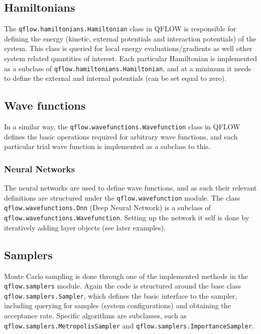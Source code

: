 \documentclass[Thesis.tex]{subfiles}
\begin{document}
\subsection{Hamiltonians}

The \texttt{qflow.\-hamiltonians.\-Hamiltonian} class in QFLOW is responsible for defining the energy
(kinetic, external potentials and interaction potentials) of the system. This
class is queried for local energy evaluations/gradients as well other system
related quantities of interest. Each particular Hamiltonian is implemented as a
subclass of \texttt{qflow.\-hamiltonians.\-Hamiltonian}, and at a minimum it needs to define the
external and internal potentials (can be set equal to zero).

\subsection{Wave functions}

In a similar way, the \texttt{qflow.\-wavefunctions.\-Wavefunction} class in QFLOW defines the basic
operations required for arbitrary wave functions, and each particular trial wave
function is implemented as a subclass to this.

\subsubsection{Neural Networks}

The neural networks are used to define wave functions, and as such their
relevant definitions are structured under the \texttt{qflow.\-wavefunction} module. The
class \texttt{qflow.\-wavefunctions.\-Dnn} (Deep Neural Network) is a subclass of \texttt{qflow.\-wavefunctions.\-Wavefunction}.
Setting up the network it self is done by iteratively adding layer objects (see
later examples).

\subsection{Samplers}

Monte Carlo sampling is done through one of the implemented methods in the
\texttt{qflow.samplers} module. Again the code is structured around the base
class \texttt{qflow.samplers.Sampler}, which defines the basic interface to the
sampler, including querying for samples (system configurations) and obtaining
the acceptance rate. Specific algorithms are subclasses, such as
\texttt{qflow.\-samplers.\-MetropolisSampler} and
\texttt{qflow.\-samplers.\-ImportanceSampler}.
\end{document}
